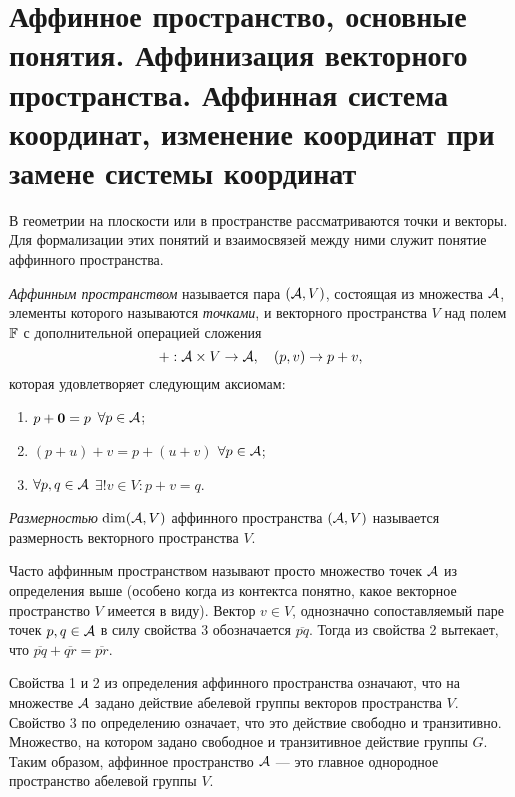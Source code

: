 \section{Аффинное пространство, основные понятия. Аффинизация векторного пространства. Аффинная система координат, изменение координат при замене системы координат}

В геометрии на плоскости или в пространстве рассматриваются точки и векторы. Для формализации этих понятий и взаимосвязей между ними служит понятие аффинного пространства.

\begin{definition}
    \textit{Аффинным пространством} называется пара $(\mathcal{A}, V)$, состоящая из множества $\mathcal{A}$, элементы которого называются \textit{точками}, и векторного пространства $V$ над полем $\mathbb{F}$ с дополнительной операцией сложения
    \[
        +: \mathcal{A} \times V \to \mathcal{A},\quad (p, v) \to p + v,
    \]
    которая удовлетворяет следующим аксиомам:
    \begin{enumerate}[nolistsep]
        \item $p + \boldsymbol{0} = p$ $\forall p \in \mathcal{A}$;
        \item $(p + u) + v = p + (u + v)$ $\forall p \in \mathcal{A}$;
        \item $\forall p, q \in \mathcal{A}$ $\exists!v \in V : p + v = q$.
    \end{enumerate}

    \textit{Размерностью} $\dim(\mathcal{A}, V)$ аффинного пространства $(\mathcal{A}, V)$ называется размерность векторного пространства $V$.
\end{definition}

Часто аффинным пространством называют просто множество точек $\mathcal{A}$ из определения выше (особено когда из контектса понятно, какое векторное пространство $V$ имеется в виду). Вектор $v \in V$, однозначно сопоставляемый паре точек $p, q \in \mathcal{A}$ в силу свойства 3 обозначается $\overline{pq}$. Тогда из свойства 2 вытекает, что $\overline{pq} + \overline{qr} = \overline{pr}$.

\begin{remark}
    Свойства 1 и 2 из определения аффинного пространства означают, что на множестве $\mathcal{A}$ задано действие абелевой группы векторов пространства $V$. Свойство 3 по определению означает, что это действие свободно и транзитивно. Множество, на котором задано свободное и транзитивное действие группы $G$. Таким образом, аффинное пространство $\mathcal{A}$ --- это главное однородное пространство абелевой группы $V$.
\end{remark}


